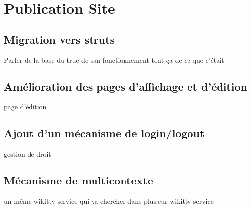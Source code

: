 \section{Publication Site}

\subsection{Migration vers struts}

Parler de la base du truc de son fonctionnement tout ça de ce que c'était



\subsection{Amélioration des pages d'affichage et d'édition}
page d'édition 





\subsection{Ajout d'un mécanisme de login/logout}

gestion de droit


\subsection{Mécanisme de multicontexte}

un même wikitty service qui va chercher dans plusieur wikitty service

